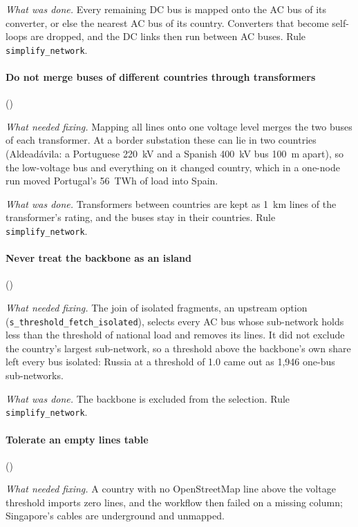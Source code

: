 \textit{What was done.}
Every remaining DC bus is mapped onto the AC bus of its converter, or else the nearest AC bus of its country.
Converters that become self-loops are dropped, and the DC links then run between AC buses.
Rule \texttt{simplify\_network}.

\paragraph{Do not merge buses of different countries through transformers} ()

\textit{What needed fixing.}
Mapping all lines onto one voltage level merges the two buses of each transformer.
At a border substation these can lie in two countries (Aldeadávila: a Portuguese \SI{220}{kV} and a Spanish \SI{400}{kV} bus \SI{100}{m} apart), so the low-voltage bus and everything on it changed country, which in a one-node run moved Portugal's \SI{56}{TWh} of load into Spain.

\textit{What was done.}
Transformers between countries are kept as \SI{1}{km} lines of the transformer's rating, and the buses stay in their countries.
Rule \texttt{simplify\_network}.

\paragraph{Never treat the backbone as an island} ()

\textit{What needed fixing.}
The join of isolated fragments, an upstream option (\texttt{s\_\allowbreak threshold\_\allowbreak fetch\_\allowbreak isolated}), selects every AC bus whose sub-network holds less than the threshold of national load and removes its lines.
It did not exclude the country's largest sub-network, so a threshold above the backbone's own share left every bus isolated: Russia at a threshold of 1.0 came out as 1,946 one-bus sub-networks.

\textit{What was done.}
The backbone is excluded from the selection.
Rule \texttt{simplify\_network}.

\paragraph{Tolerate an empty lines table} ()

\textit{What needed fixing.}
A country with no OpenStreetMap line above the voltage threshold imports zero lines, and the workflow then failed on a missing column; Singapore's cables are underground and unmapped.

